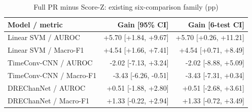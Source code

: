 \begin{table}[t]
\centering
\caption{Full PR minus Score-Z: existing six-comparison family (pp)}
\small
\begin{tabular}{lrr}
\toprule
Model / metric & Gain [95\% CI] & Gain [6-test CI] \\
\midrule
Linear SVM / AUROC & +5.70 [+1.84, +9.67] & +5.70 [+0.26, +11.21] \\
Linear SVM / Macro-F1 & +4.54 [+1.66, +7.41] & +4.54 [+0.71, +8.49] \\
TimeConv-CNN / AUROC & -2.02 [-7.13, +3.24] & -2.02 [-8.88, +5.09] \\
TimeConv-CNN / Macro-F1 & -3.43 [-6.26, -0.51] & -3.43 [-7.31, +0.34] \\
DREChanNet / AUROC & +0.51 [-1.88, +2.80] & +0.51 [-2.68, +3.61] \\
DREChanNet / Macro-F1 & +1.33 [-0.22, +2.94] & +1.33 [-0.72, +3.49] \\
\bottomrule
\end{tabular}
\end{table}
